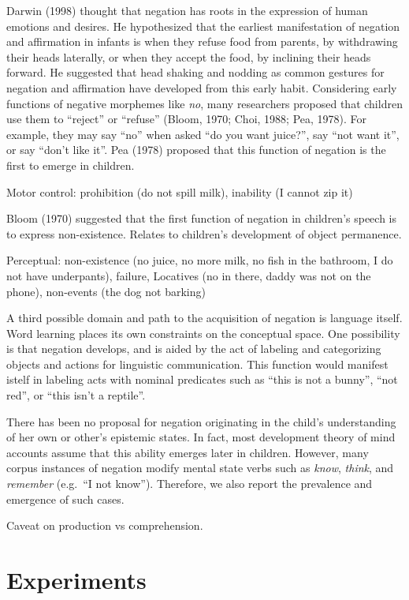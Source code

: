 \documentclass[10pt, letterpaper]{article}
\begin{document}
Darwin (1998) thought that negation has roots in the expression of human
emotions and desires. He hypothesized that the earliest manifestation of
negation and affirmation in infants is when they refuse food from
parents, by withdrawing their heads laterally, or when they accept the
food, by inclining their heads forward. He suggested that head shaking
and nodding as common gestures for negation and affirmation have
developed from this early habit. Considering early functions of negative
morphemes like \emph{no}, many researchers proposed that children use
them to ``reject'' or ``refuse'' (Bloom, 1970; Choi, 1988; Pea, 1978).
For example, they may say ``no'' when asked ``do you want juice?'', say
``not want it'', or say ``don't like it''. Pea (1978) proposed that this
function of negation is the first to emerge in children.

Motor control: prohibition (do not spill milk), inability (I cannot zip
it)

Bloom (1970) suggested that the first function of negation in children's
speech is to express non-existence. Relates to children's development of
object permanence.

Perceptual: non-existence (no juice, no more milk, no fish in the
bathroom, I do not have underpants), failure, Locatives (no in there,
daddy was not on the phone), non-events (the dog not barking)

A third possible domain and path to the acquisition of negation is
language itself. Word learning places its own constraints on the
conceptual space. One possibility is that negation develops, and is
aided by the act of labeling and categorizing objects and actions for
linguistic communication. This function would manifest istelf in
labeling acts with nominal predicates such as ``this is not a bunny'',
``not red'', or ``this isn't a reptile''.

There has been no proposal for negation originating in the child's
understanding of her own or other's epistemic states. In fact, most
development theory of mind accounts assume that this ability emerges
later in children. However, many corpus instances of negation modify
mental state verbs such as \emph{know}, \emph{think}, and
\emph{remember} (e.g.~``I not know''). Therefore, we also report the
prevalence and emergence of such cases.

Caveat on production vs comprehension.

\hypertarget{experiments}{%
\section{Experiments}\label{experiments}}
\end{document}
